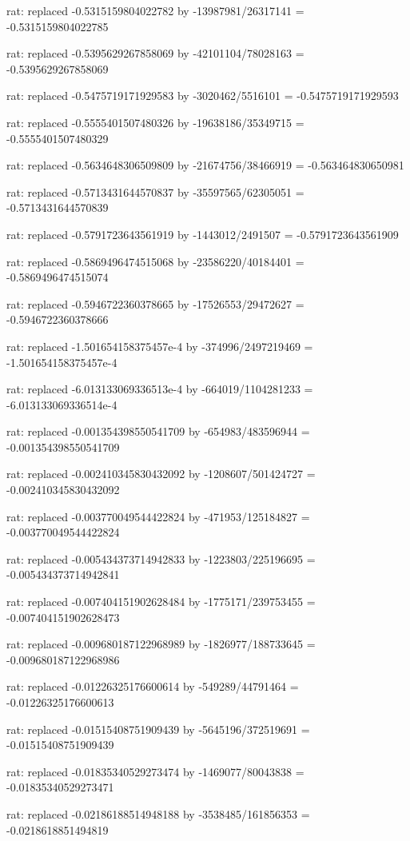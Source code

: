 \documentclass[a4paper,10pt]{article}
\begin{document}
\begin{eulernotebook}
\begin{eulercomment}
\begin{eulercomment}
\begin{eulercomment}
\begin{eulercomment}
\begin{eulercomment}
\begin{eulercomment}
\begin{eulercomment}
\begin{eulercomment}
\begin{eulercomment}
\begin{eulercomment}
\begin{eulercomment}
\begin{eulercomment}
\begin{eulercomment}
\begin{eulercomment}
\begin{eulercomment}
\begin{eulercomment}
\begin{euleroutput}
  rat: replaced -0.5315159804022782 by -13987981/26317141 = -0.5315159804022785
  
  rat: replaced -0.5395629267858069 by -42101104/78028163 = -0.5395629267858069
  
  rat: replaced -0.5475719171929583 by -3020462/5516101 = -0.5475719171929593
  
  rat: replaced -0.5555401507480326 by -19638186/35349715 = -0.5555401507480329
  
  rat: replaced -0.5634648306509809 by -21674756/38466919 = -0.563464830650981
  
  rat: replaced -0.5713431644570837 by -35597565/62305051 = -0.5713431644570839
  
  rat: replaced -0.5791723643561919 by -1443012/2491507 = -0.5791723643561909
  
  rat: replaced -0.5869496474515068 by -23586220/40184401 = -0.5869496474515074
  
  rat: replaced -0.5946722360378665 by -17526553/29472627 = -0.5946722360378666
  
  rat: replaced -1.501654158375457e-4 by -374996/2497219469 = -1.501654158375457e-4
  
  rat: replaced -6.013133069336513e-4 by -664019/1104281233 = -6.013133069336514e-4
  
  rat: replaced -0.001354398550541709 by -654983/483596944 = -0.001354398550541709
  
  rat: replaced -0.002410345830432092 by -1208607/501424727 = -0.002410345830432092
  
  rat: replaced -0.003770049544422824 by -471953/125184827 = -0.003770049544422824
  
  rat: replaced -0.005434373714942833 by -1223803/225196695 = -0.005434373714942841
  
  rat: replaced -0.007404151902628484 by -1775171/239753455 = -0.007404151902628473
  
  rat: replaced -0.009680187122968989 by -1826977/188733645 = -0.009680187122968986
  
  rat: replaced -0.01226325176600614 by -549289/44791464 = -0.01226325176600613
  
  rat: replaced -0.01515408751909439 by -5645196/372519691 = -0.01515408751909439
  
  rat: replaced -0.01835340529273474 by -1469077/80043838 = -0.01835340529273471
  
  rat: replaced -0.02186188514948188 by -3538485/161856353 = -0.0218618851494819
  

\end{euleroutput}
\end{eulercomment}
\end{eulercomment}
\end{eulercomment}
\end{eulercomment}
\end{eulercomment}
\end{eulercomment}
\end{eulercomment}
\end{eulercomment}
\end{eulercomment}
\end{eulercomment}
\end{eulercomment}
\end{eulercomment}
\end{eulercomment}
\end{eulercomment}
\end{eulercomment}
\end{eulercomment}
\end{eulernotebook}
\end{document}
